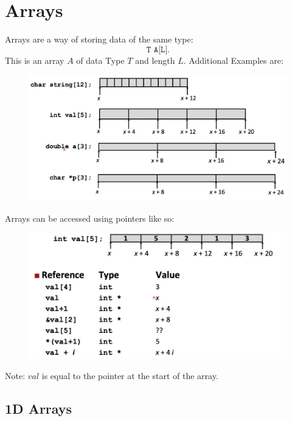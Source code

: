 \documentclass[12pt]{book}
\title{\coursetitle\linebreak\lecturename}
\author{\\Cain Susko\\ 
           \\ \\ \\
      Queen's University 
    \\School of Computing\\}
\begin{document}
\begin{titlepage}
        \maketitle
\end{titlepage}


\section*{Arrays}
Arrays are a way of storing data of the same type:
\[
\texttt{T A[L]}
.\] 
This is an array $A$ of data Type  $T$ and length $L$. Additional Examples are:
\begin{figure}[h]
        \centering
        \includegraphics[scale = 0.3]{./figures/arrayEx}
\end{figure}

Arrays can be accessed using pointers like so:
\begin{figure}[h]
        \centering
        \includegraphics[scale = 0.4]{./figures/arrayPointers}
\end{figure}

Note: $val$ is equal to the pointer at the start of the array.
\pagebreak
\subsection*{1D Arrays}
\end{document}
